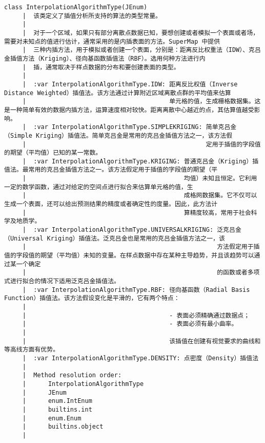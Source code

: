 \documentclass[11pt]{article}
\begin{document}
\begin{Verbatim}[commandchars=\\\{\}]
    class InterpolationAlgorithmType(JEnum)
     |  该类定义了插值分析所支持的算法的类型常量。
     |  
     |  对于一个区域，如果只有部分离散点数据已知，要想创建或者模拟一个表面或者场，需要对未知点的值进行估计，通常采用的是内插表面的方法。SuperMap 中提供
     |  三种内插方法，用于模拟或者创建一个表面，分别是：距离反比权重法（IDW）、克吕金插值方法（Kriging）、径向基函数插值法（RBF）。选用何种方法进行内
     |  插，通常取决于样点数据的分布和要创建表面的类型。
     |  
     |  :var InterpolationAlgorithmType.IDW: 距离反比权值（Inverse Distance Weighted）插值法。该方法通过计算附近区域离散点群的平均值来估算
     |                                       单元格的值，生成栅格数据集。这是一种简单有效的数据内插方法，运算速度相对较快。距离离散中心越近的点，其估算值越受影响。
     |  :var InterpolationAlgorithmType.SIMPLEKRIGING: 简单克吕金（Simple Kriging）插值法。简单克吕金是常用的克吕金插值方法之一，该方法假
     |                                                 定用于插值的字段值的期望（平均值）已知的某一常数。
     |  :var InterpolationAlgorithmType.KRIGING: 普通克吕金（Kriging）插值法。最常用的克吕金插值方法之一。该方法假定用于插值的字段值的期望（平
     |                                           均值）未知且恒定。它利用一定的数学函数，通过对给定的空间点进行拟合来估算单元格的值，生
     |                                           成格网数据集。它不仅可以生成一个表面，还可以给出预测结果的精度或者确定性的度量。因此，此方法计
     |                                           算精度较高，常用于社会科学及地质学。
     |  :var InterpolationAlgorithmType.UNIVERSALKRIGING: 泛克吕金（Universal Kriging）插值法。泛克吕金也是常用的克吕金插值方法之一，该
     |                                                    方法假定用于插值的字段值的期望（平均值）未知的变量。在样点数据中存在某种主导趋势，并且该趋势可以通过某一个确定
     |                                                    的函数或者多项式进行拟合的情况下适用泛克吕金插值法。
     |  :var InterpolationAlgorithmType.RBF: 径向基函数（Radial Basis Function）插值法。该方法假设变化是平滑的，它有两个特点：
     |  
     |                                       - 表面必须精确通过数据点；
     |                                       - 表面必须有最小曲率。
     |  
     |                                       该插值在创建有视觉要求的曲线和等高线方面有优势。
     |  :var InterpolationAlgorithmType.DENSITY: 点密度（Density）插值法
     |  
     |  Method resolution order:
     |      InterpolationAlgorithmType
     |      JEnum
     |      enum.IntEnum
     |      builtins.int
     |      enum.Enum
     |      builtins.object
     |  

\end{Verbatim}
\end{document}
